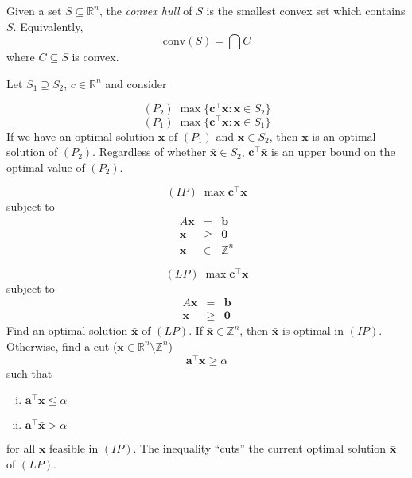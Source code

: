 \begin{defbox}
    \begin{definition}
        Given a set $ S\subseteq \mathbb{R}^n $, the \emph{convex hull} of $ S $
        is the smallest convex set which contains $ S $.
        Equivalently,
        \[ \text{conv}(S)=\bigcap C \]
        where $ C\subseteq S $ is convex.
    \end{definition}
\end{defbox}

Let $ S_1\supseteq S_2 $, $ c\in\mathbb{R}^n $ and consider

\[ (P_2)\; \max \{\bm{c}^\top\bm{x}:\bm{x}\in S_2\} \]
\[ (P_1)\; \max \{\bm{c}^\top\bm{x}:\bm{x}\in S_1\} \]
If we have an optimal solution $ \bm{\bar{x}} $ of $ (P_1) $ and $ \bm{\bar{x}}\in S_2 $,
then $ \bm{\bar{x}} $ is an optimal solution of $ (P_2) $. Regardless of whether
$ \bm{\bar{x}}\in S_2 $, $ \bm{c}^\top \bm{\bar{x}} $ is an upper bound on the optimal
value of $ (P_2) $.

\[ (IP)\; \max \bm{c}^\top \bm{x} \]
subject to
\[
    \begin{array}{ccc}
        A\bm{x} & =         & \bm{b}       \\
        \bm{x}  & \geqslant & \bm{0}       \\
        \bm{x}  & \in       & \mathbb{Z}^n
    \end{array} \]

\[ (LP)\; \max \bm{c}^\top \bm{x} \]
subject to
\[
    \begin{array}{ccc}
        A\bm{x} & =         & \bm{b} \\
        \bm{x}  & \geqslant & \bm{0}
    \end{array} \]
Find an optimal solution $ \bm{\bar{x}} $ of $ (LP) $. If $ \bm{\bar{x}}\in\mathbb{Z}^n $,
then $ \bm{\bar{x}} $ is optimal in $ (IP) $. Otherwise,
find a cut ($ \bm{\bar{x}}\in\mathbb{R}^n\setminus \mathbb{Z}^n $)
\[ \bm{a}^\top \bm{x} \geqslant \alpha \]
such that
\begin{enumerate}[(i)]
    \item $ \bm{a}^\top\bm{x}\leqslant \alpha $
    \item $ \bm{a}^\top \bm{\bar{x}}>\alpha $
\end{enumerate}
for all $ \bm{x} $ feasible in $ (IP) $. The inequality ``cuts''
the current optimal solution $ \bm{\bar{x}} $ of $ (LP) $.

